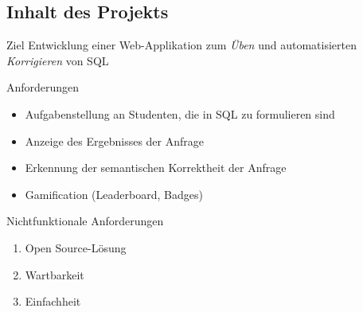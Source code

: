 \subsection{Inhalt des Projekts}

\begin{frame}{\insertsectionhead}{\insertsubsectionhead}
  \begin{block}{Ziel}
    Entwicklung einer Web-Applikation zum \emph{Üben} und automatisierten \emph{Korrigieren} von SQL
  \end{block}

  \pause

  \begin{block}{Anforderungen}{\insertsubsectionhead}
    \begin{itemize}
      \item Aufgabenstellung an Studenten, die in SQL zu formulieren sind
      \item Anzeige des Ergebnisses der Anfrage
      \item Erkennung der semantischen Korrektheit der Anfrage
      \item Gamification (Leaderboard, Badges)
    \end{itemize}
  \end{block}
\end{frame}

\begin{frame}{\insertsectionhead}{\insertsubsectionhead}
  \begin{block}{Nichtfunktionale Anforderungen}
    \begin{enumerate}
      \item Open Source-Lösung
      \item Wartbarkeit
      \item Einfachheit
    \end{enumerate}
  \end{block}
\end{frame}

